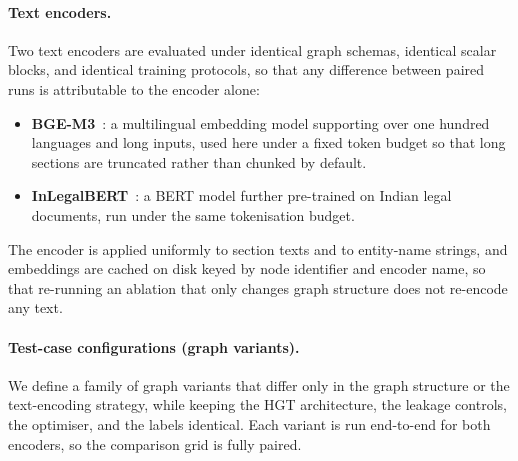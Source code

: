 \documentclass[runningheads]{llncs}
\begin{document}
\paragraph{Text encoders.}
Two text encoders are evaluated under identical graph schemas, identical scalar blocks, and identical training protocols, so that any difference between paired runs is attributable to the encoder alone:
\begin{itemize}[leftmargin=*]
    \item \textbf{BGE-M3}~\cite{chen2024bgem3}: a multilingual embedding model supporting over one hundred languages and long inputs, used here under a fixed token budget so that long sections are truncated rather than chunked by default.
    \item \textbf{InLegalBERT}~\cite{paul2023inlegalbert}: a BERT model further pre-trained on Indian legal documents, run under the same tokenisation budget.
\end{itemize}
The encoder is applied uniformly to section texts and to entity-name strings, and embeddings are cached on disk keyed by node identifier and encoder name, so that re-running an ablation that only changes graph structure does not re-encode any text.

\paragraph{Test-case configurations (graph variants).}
We define a family of graph variants that differ only in the graph structure or the text-encoding strategy, while keeping the HGT architecture, the leakage controls, the optimiser, and the labels identical. Each variant is run end-to-end for both encoders, so the comparison grid is fully paired.
\end{document}
